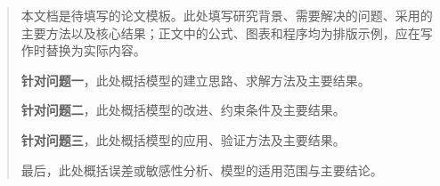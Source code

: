 \begin{abstract}
本文档是待填写的论文模板。此处填写研究背景、需要解决的问题、采用的主要方法以及核心结果；正文中的公式、图表和程序均为排版示例，应在写作时替换为实际内容。

\textbf{针对问题一}，此处概括模型的建立思路、求解方法及主要结果。

\textbf{针对问题二}，此处概括模型的改进、约束条件及主要结果。

\textbf{针对问题三}，此处概括模型的应用、验证方法及主要结果。

最后，此处概括误差或敏感性分析、模型的适用范围与主要结论。

\end{abstract}
